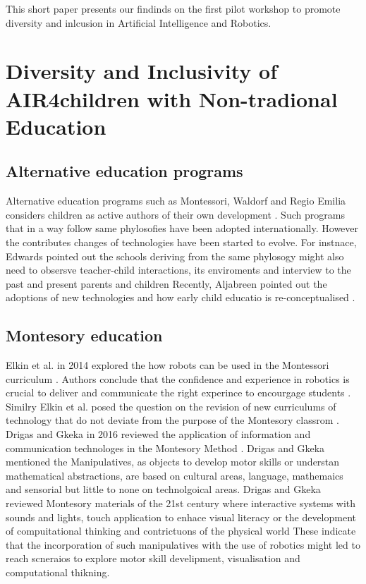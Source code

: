 \documentclass[conference]{IEEEtran}
\begin{document}
This short paper presents our findinds on the first pilot workshop to promote diversity and inlcusion in Artificial Intelligence and Robotics.


\section{Diversity and Inclusivity of AIR4children with Non-tradional Education}

\subsection{Alternative education programs}
Alternative education programs such as Montessori, Waldorf and Regio Emilia considers children as active authors of their own development \cite{edwards2002}.
Such programs that in a way follow same phylosofies have been adopted internationally.
However the contributes changes of technologies have been started to evolve. 
For instnace, Edwards pointed out the schools deriving from the same phylosogy might also need to obsersve teacher-child interactions, its enviroments and interview to the past and present parents and children \cite{edwards2002}
Recently, Aljabreen pointed out the adoptions of new technologies and how early child educatio is re-conceptualised \cite{Aljabreen2020}.

\subsection{Montesory education}
Elkin et al. in 2014 explored the how robots can be used in the Montessori curriculum \cite{elkin2014}.
Authors conclude that the confidence and experience in robotics is crucial to deliver and communicate the right experince to encourgage students \cite{elkin2014}.
Similry Elkin et al. posed the question on the revision of new curriculums of technology that do not deviate from the purpose of the Montesory classrom \cite{elkin2014}.
Drigas and Gkeka in 2016 reviewed the application of information and communication technologes in the Montesory Method \cite{DrigasGkeka2016}.
Drigas and Gkeka mentioned the Manipulatives, as objects to develop motor skills or understan mathematical abstractions, are based on cultural areas, language, mathemaics and sensorial but little to none on technolgoical areas.
Drigas and Gkeka reviewed Montesory materials of the 21st century where interactive systems with sounds and lights, touch application to enhace visual literacy or the development of compuitational thinking and contrictuons of the physical world \cite{DrigasGkeka2016}
These indicate that the incorporation of such manipulatives with the use of robotics might led to reach scneraios to explore motor skill develipment, visualisation and computational thikning. 
\end{document}
